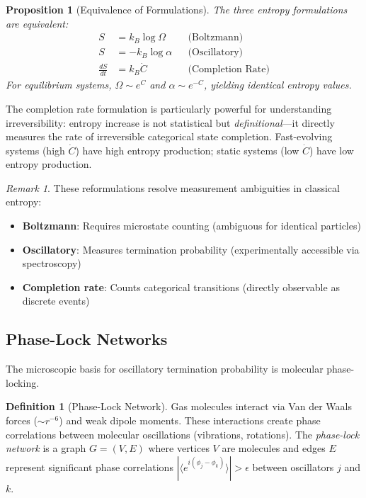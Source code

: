 \documentclass[superscriptaddress,prb,10pt]{revtex4-2}
\newtheorem{proposition}[theorem]{Proposition}
\theoremstyle{definition}
\newtheorem{definition}[theorem]{Definition}
\theoremstyle{remark}
\newtheorem{remark}[theorem]{Remark}
\begin{document}
\begin{proposition}[Equivalence of Formulations]
\label{prop:entropy_equivalence}
The three entropy formulations are equivalent:
\begin{align}
S &= k_B \log \Omega && \text{(Boltzmann)} \\
S &= -k_B \log \alpha && \text{(Oscillatory)} \\
\frac{dS}{dt} &= k_B \dot{C} && \text{(Completion Rate)}
\end{align}
For equilibrium systems, $\Omega \sim e^{C}$ and $\alpha \sim e^{-C}$, yielding identical entropy values.
\end{proposition}

The completion rate formulation is particularly powerful for understanding irreversibility: entropy increase is not statistical but \emph{definitional}—it directly measures the rate of irreversible categorical state completion. Fast-evolving systems (high $\dot{C}$) have high entropy production; static systems (low $\dot{C}$) have low entropy production.

\begin{remark}
These reformulations resolve measurement ambiguities in classical entropy:
\begin{itemize}
\item \textbf{Boltzmann}: Requires microstate counting (ambiguous for identical particles)
\item \textbf{Oscillatory}: Measures termination probability (experimentally accessible via spectroscopy)
\item \textbf{Completion rate}: Counts categorical transitions (directly observable as discrete events)
\end{itemize}
\end{remark}

\subsection{Phase-Lock Networks}

The microscopic basis for oscillatory termination probability is molecular phase-locking.

\begin{definition}[Phase-Lock Network]
Gas molecules interact via Van der Waals forces ($\sim r^{-6}$) and weak dipole moments. These interactions create phase correlations between molecular oscillations (vibrations, rotations). The \emph{phase-lock network} is a graph $G = (V, E)$ where vertices $V$ are molecules and edges $E$ represent significant phase correlations $|\langle e^{i(\phi_j - \phi_k)}\rangle| > \epsilon$ between oscillators $j$ and $k$.
\end{definition}
\end{document}

